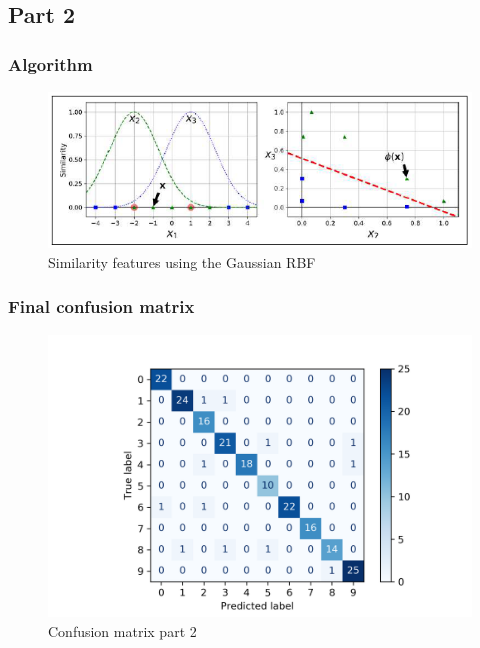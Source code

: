 \newpage

\subsection{Part 2}
\subsubsection{Algorithm}
\label{appendix:algo}
\begin{figure}[h]
	\centering 
	\includegraphics{Pics/RBF}
	\caption{Similarity features using the Gaussian RBF}
	\label{fig:rbfgaussian}
\end{figure} 

\subsubsection{Final confusion matrix}
\begin{figure}[h]
	\centering 
	\includegraphics[scale=0.9]{Pics/part2confusion_mat}
	\caption{Confusion matrix part 2}
	\label{fig:confusion}
\end{figure} 

